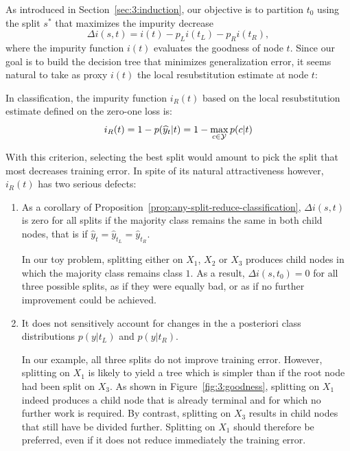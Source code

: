 As introduced in Section~\ref{sec:3:induction}, our objective is to partition
$t_0$ using the split $s^*$ that maximizes the impurity decrease $$\Delta i(s,
t) = i(t) - p_L i(t_L) - p_R i(t_R),$$ where the impurity function $i(t)$
evaluates the goodness of node $t$. Since our goal is to build the decision
tree that minimizes generalization error, it seems natural to take as proxy
$i(t)$ the local resubstitution estimate at node $t$:
\begin{definition}
In classification, the impurity function $i_R(t)$ based on the local resubstitution estimate
defined on the zero-one loss is:
\begin{equation}\label{eqn:impurity:error}
i_R(t) = 1 - p(\widehat{y}_t|t) =  1 - \max_{c \in {\cal Y}} p(c|t)
\end{equation}
\end{definition}
With this criterion, selecting the best split would amount to pick the split that most
decreases training error. In spite of its natural attractiveness however,
$i_R(t)$ has two serious defects:
\begin{enumerate}
\item As a corollary of Proposition~\ref{prop:any-split-reduce-classification},
      $\Delta i(s, t)$ is zero for all splits if the majority class remains
      the same in both child nodes, that is if $\widehat{y}_t = \widehat{y}_{t_L} = \widehat{y}_{t_R}$.

      In our toy problem, splitting either on $X_1$, $X_2$ or $X_3$ produces
      child nodes in which the majority class remains class $1$. As a result,
      $\Delta i(s, t_0) = 0$ for all three possible splits, as if they were
      equally bad, or as if no further improvement could be achieved.

\item It does not sensitively account for changes in the a posteriori class
      distributions $p(y|t_L)$ and $p(y|t_R)$.

      In our example, all three splits do not improve training error. However,
      splitting on $X_1$ is likely to yield a tree which is simpler than if the
      root node had been split on $X_3$.  As shown in
      Figure~\ref{fig:3:goodness}, splitting on $X_1$ indeed produces a child
      node that is already terminal and for which no further work is required.
      By contrast, splitting on $X_3$ results in child nodes that still have be
      divided further.  Splitting on $X_1$ should therefore be preferred, even
      if it does not reduce immediately the training error.
\end{enumerate}

